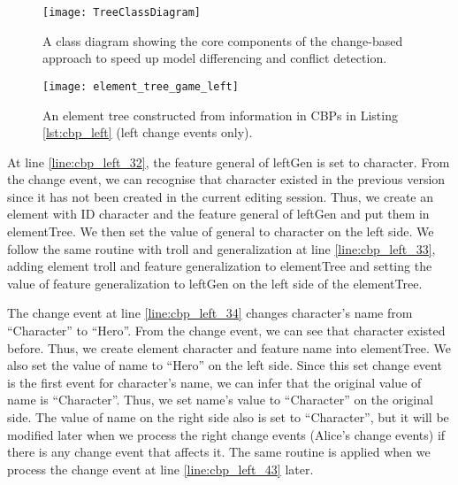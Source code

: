 \begin{landscape}
  \begin{figure}
    \texttt{[image: TreeClassDiagram]}
    \caption{A class diagram showing the core components of the change-based approach to speed up model differencing and conflict detection.}
    \label{fig:approach_class_diagram}
  \end{figure}
\end{landscape}

\begin{figure}[ht]
  \centering
  \texttt{[image: element\_tree\_game\_left]}
  \caption{An element tree constructed from information in CBPs in Listing \ref{lst:cbp_left} (left change events only).}
  \label{fig:left_element_tree_diagram}
\end{figure}

At line \ref{line:cbp_left_32}, the feature \textsf{general} of \textsf{leftGen} is set to \textsf{character}. From the change event, we can recognise that \textsf{character} existed in the previous version since it has not been created in the current editing session. Thus, we create an element with ID \textsf{character} and the feature \textsf{general} of \textsf{leftGen} and put them in \textsf{elementTree}. We then set the value of \textsf{general} to \textsf{character} on the left side. We follow the same routine with \textsf{troll} and \textsf{generalization} at line \ref{line:cbp_left_33}, adding element \textsf{troll} and feature \textsf{generalization} to \textsf{elementTree} and setting the value of feature \textsf{generalization} to \textsf{leftGen} on the left side of the \textsf{elementTree}.

The change event at line \ref{line:cbp_left_34} changes \textsf{character}’s \textsf{name} from “Character” to “Hero”. From the change event, we can see that \textsf{character} existed before. Thus, we create element \textsf{character} and feature \textsf{name} into \textsf{elementTree}. We also set the value of \textsf{name} to “Hero” on the left side. Since this set change event is the first event for \textsf{character}’s \textsf{name}, we can infer that the original value of \textsf{name} is “Character”. Thus, we set \textsf{name}’s value to “Character” on the original side. The value of \textsf{name} on the right side also is set to “Character”, but it will be modified later when we process the right change events (Alice’s change events) if there is any change event that affects it. The same routine is applied when we process the change event at line \ref{line:cbp_left_43} later.

